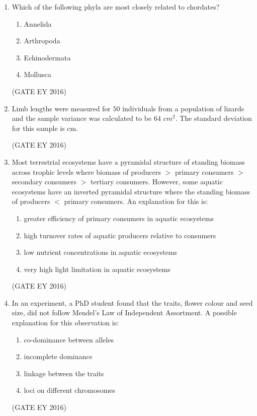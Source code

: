 \documentclass[journal]{IEEEtran}
\begin{document}
\begin{enumerate}
\item Which of the following phyla are most closely related to chordates?
\begin{multicols}{4}
\begin{enumerate}
    \item Annelida
    \item Arthropoda
    \item Echinodermata
    \item Mollusca
\end{enumerate}
\end{multicols}
\hfill{(GATE EY 2016)}

\item Limb lengths were measured for $50$ individuals from a population of lizards and the sample variance was calculated to be $64$ $cm^{2}$. The standard deviation for this sample is \underline{\hspace{3cm}} cm.

\hfill{(GATE EY 2016)}

\item Most terrestrial ecosystems have a pyramidal structure of standing biomass across trophic levels where biomass of producers $>$ primary consumers $>$ secondary consumers $>$ tertiary consumers. However, some aquatic ecosystems have an inverted pyramidal structure where the standing biomass of producers $<$ primary consumers. An explanation for this is:
\begin{enumerate}
    \item greater efficiency of primary consumers in aquatic ecosystems
    \item high turnover rates of aquatic producers relative to consumers
    \item low nutrient concentrations in aquatic ecosystems
    \item very high light limitation in aquatic ecosystems
\end{enumerate}
\hfill{(GATE EY 2016)}

\item In an experiment, a PhD student found that the traits, flower colour and seed size, did not follow Mendel's Law of Independent Assortment. A possible explanation for this observation is:
\begin{multicols}{2}
\begin{enumerate}
    \item co-dominance between alleles
    \item incomplete dominance
    \item linkage between the traits
    \item loci on different chromosomes
\end{enumerate}
\end{multicols}
\hfill{(GATE EY 2016)}


\end{enumerate}
\end{document}
